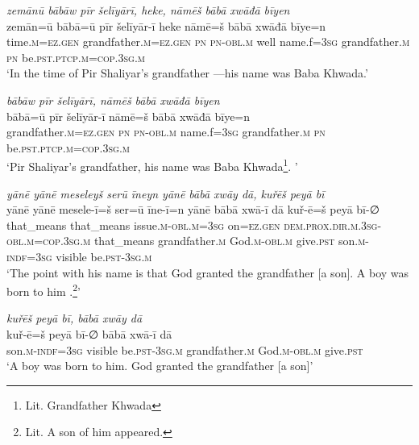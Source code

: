 \ea \label{BP.1}
\textit{zemānū bābāw pīr šelīyārī, heke, nāmēš bābā xwāđā bīyen} \\ 
\gll zemān=ū bābā=ū pīr šelīyār-ī heke nāmē=š bābā xwāđā bīye=n \\ 
 time\textsc{.m}\textsc{=ez.gen} grandfather\textsc{.m}\textsc{=ez.gen} \textsc{pn} \textsc{pn}\textsc{-obl}\textsc{.m} well name.f\textsc{=3sg} grandfather\textsc{.m} \textsc{pn} be\textsc{.pst}\textsc{.ptcp}\textsc{.m}\textsc{=cop}\textsc{.3sg}\textsc{.m} \\ 
\glt `In the time of Pir Shaliyar’s grandfather —his name was Baba Khwada.'
\z 
 
\ea \label{BP.2}
\textit{bābāw pīr šelīyārī, nāmēš bābā xwāđā bīyen} \\ 
\gll bābā=ū pīr šelīyār-ī nāmē=š bābā xwāđā bīye=n \\ 
 grandfather\textsc{.m}\textsc{=ez.gen} \textsc{pn} \textsc{pn}\textsc{-obl}\textsc{.m} name.f\textsc{=3sg} grandfather\textsc{.m} \textsc{pn} be\textsc{.pst}\textsc{.ptcp}\textsc{.m}\textsc{=cop}\textsc{.3sg}\textsc{.m} \\ 
\glt `Pir Shaliyar’s grandfather, his name was Baba Khwada\footnote{Lit. Grandfather Khwada}. '
\z 
 
\ea \label{BP.3}
\textit{yānē yānē meseleyš serū īneyn yānē bābā xwāy dā, kuřēš peyā bī} \\ 
\gll yānē yānē mesele-ī=š ser=ū īne-ī=n yānē bābā xwā-ī dā kuř-ē=š peyā bī-∅ \\ 
 that\_means that\_means issue\textsc{.m}\textsc{-obl}\textsc{.m}\textsc{=3sg} on\textsc{=ez.gen} \textsc{dem.prox}\textsc{.dir}\textsc{.m}\textsc{.3sg}\textsc{-obl}\textsc{.m}\textsc{=cop}\textsc{.3sg}\textsc{.m} that\_means grandfather\textsc{.m} God\textsc{.m}\textsc{-obl}\textsc{.m} give\textsc{.pst} son\textsc{.m}\textsc{-indf}\textsc{=3sg} visible be\textsc{.pst}\textsc{-3sg}\textsc{.m} \\ 
\glt `The point with his name is that God granted the grandfather [a son]. A boy  was born to him .\footnote{Lit. A son of him appeared.}'
\z 
 
\ea \label{BP.4}
\textit{kuřēš peyā bī, bābā xwāy dā} \\ 
\gll kuř-ē=š peyā bī-∅ bābā xwā-ī dā \\ 
 son\textsc{.m}\textsc{-indf}\textsc{=3sg} visible be\textsc{.pst}\textsc{-3sg}\textsc{.m} grandfather\textsc{.m} God\textsc{.m}\textsc{-obl}\textsc{.m} give\textsc{.pst} \\ 
\glt `A boy  was born to him. God granted the grandfather [a son]'
\z 
 
